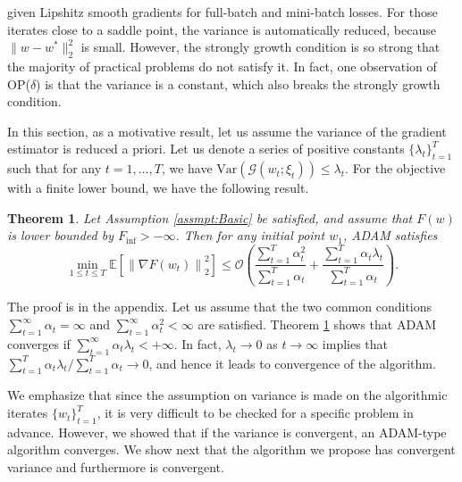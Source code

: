 \documentclass[twoside]{article}
\def\EE{\mathbb{E}}
\def\OO{\mathcal{O}}
\def\GG{\mathcal{G}}
\newtheorem{theorem}{Theorem}
\begin{document}
given Lipshitz smooth gradients for full-batch and mini-batch losses. For those iterates close to a saddle point, the variance is automatically reduced, because $\|w-w^*\|_2^2$ is small. However, the strongly growth condition is so strong that the majority of practical problems do not satisfy it. In fact, one observation of OP($\delta$) is that the variance is a constant, which also breaks the strongly growth condition. 

In this section, as a motivative result, let us assume the variance of the gradient estimator is reduced a priori.
Let us denote a series of positive constants $\{\lambda_t\}_{t= 1}^T$ such that for any $t=1,\ldots, T$, we have $\mathrm{Var}(\GG (w_t; \xi_t))\leq \lambda_t.\nonumber$
For the objective with a finite lower bound, we have the following result.
\begin{theorem}
\label{thm:MtvNonCvx}
Let Assumption \ref{assmpt:Basic} be satisfied, and assume that $F(w)$ is lower bounded by $F_{\mathrm{inf}}>-\infty$. Then for any initial point $w_1$, ADAM satisfies
\begin{equation}
    \min_{1\leq t \leq T} \EE\left[\left\|\nabla F(w_t)\right\|_2^2\right] \leq \OO\left( \frac{\sum_{t=1}^T \alpha_t^2}{\sum_{t=1}^T \alpha_t} + \frac{\sum_{t=1}^{T} \alpha_t\lambda_t}{\sum_{t=1}^T{\alpha_t}}\right).\nonumber
\end{equation}
\end{theorem}
The proof is in the appendix. Let us assume that the two common conditions $\sum_{t=1}^\infty \alpha_t = \infty$ and $\sum_{t=1}^\infty \alpha_t^2 <\infty$ are satisfied. Theorem \ref{thm:MtvNonCvx} shows that ADAM converges if $\sum_{t=1}^{\infty} \alpha_t\lambda_t<+\infty$. In fact, $\lambda_t \to 0 $ as $t\to\infty$ implies that $\sum_{t=1}^{T}\alpha_t \lambda_t / \sum_{t=1}^T \alpha_t \to 0$, and hence it leads to convergence of the algorithm.

We emphasize that since the assumption on variance is made on the algorithmic iterates $\{w_t\}_{t=1}^T$, it is very difficult to be checked for a specific problem in advance. However, we showed that if the variance is convergent, an ADAM-type algorithm converges. We show next that the algorithm we propose has convergent variance and furthermore is convergent.
\end{document}
